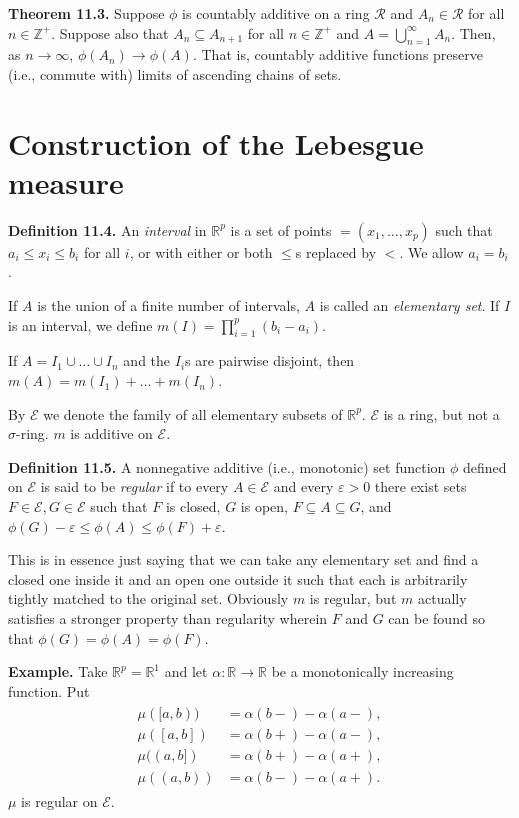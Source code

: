 \documentclass[a4paper]{article}
\newcommand{\R}{\mathbb{R}}
\newcommand{\Z}{\mathbb{Z}}
\begin{document}
\textbf{Theorem 11.3.} Suppose $\phi$ is countably additive on a ring $\mathscr{R}$ and $A_n \in \mathscr{R}$ for all $n \in \Z^+$. Suppose also that $A_{n} \subseteq A_{n+1}$ for all $n \in \Z^+$ and $A = \bigcup_{n=1}^\infty A_n$. Then, as $n \to \infty$, $\phi(A_n) \to \phi(A)$. That is, countably additive functions preserve (i.e., commute with) limits of ascending chains of sets.

\section{Construction of the Lebesgue measure}

\textbf{Definition 11.4.} An \emph{interval} in $\R^p$ is a set of points $\mathbf = (x_1, \ldots, x_p)$ such that $a_i \leq x_i \leq b_i$ for all $i$, or with either or both $\leq$s replaced by $<$. We allow $a_i = b_i$.

If $A$ is the union of a finite number of intervals, $A$ is called an \emph{elementary set}. If $I$ is an interval, we define $m(I) = \prod_{i=1}^p (b_i - a_i)$.

If $A = I_1 \cup \ldots \cup I_n$ and the $I_i$s are pairwise disjoint, then $m(A) = m(I_1) + \ldots + m(I_n)$.

By $\mathscr{E}$ we denote the family of all elementary subsets of $\R^p$. $\mathscr{E}$ is a ring, but not a $\sigma$-ring. $m$ is additive on $\mathscr{E}$.

\textbf{Definition 11.5.} A nonnegative additive (i.e., monotonic) set function $\phi$ defined on $\mathscr{E}$ is said to be \emph{regular} if to every $A \in \mathscr{E}$ and every $\varepsilon > 0$ there exist sets $F \in \mathscr{E}, G \in \mathscr{E}$ such that $F$ is closed, $G$ is open, $F \subseteq A \subseteq G$, and $\phi(G) - \varepsilon \leq \phi(A) \leq \phi(F) + \varepsilon$.

This is in essence just saying that we can take any elementary set and find a closed one inside it and an open one outside it such that each is arbitrarily tightly matched to the original set. Obviously $m$ is regular, but $m$ actually satisfies a stronger property than regularity wherein $F$ and $G$ can be found so that $\phi(G) = \phi(A) = \phi(F)$.

\textbf{Example.} Take $\R^p = \R^1$ and let $\alpha : \R \to \R$ be a monotonically increasing function. Put
\begin{align}
\begin{split}
    \mu([a, b)) &= \alpha(b-) - \alpha(a-), \\
    \mu([a, b]) &= \alpha(b+) - \alpha(a-), \\
    \mu((a, b]) &= \alpha(b+) - \alpha(a+), \\
    \mu((a, b)) &= \alpha(b-) - \alpha(a+).
\end{split}
\end{align}
$\mu$ is regular on $\mathscr{E}$.
\end{document}
